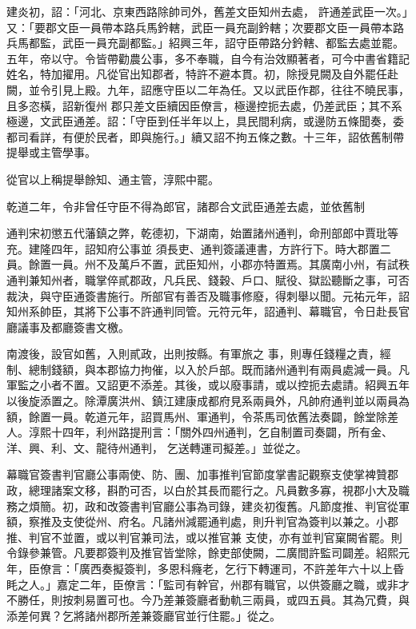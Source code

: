 \begin{pinyinscope}
 建炎初，詔：「河北、京東西路除帥司外，舊差文臣知州去處，
 許通差武臣一次。」又：「要郡文臣一員帶本路兵馬鈐轄，武臣一員充副鈐轄；次要郡文臣一員帶本路兵馬都監，武臣一員充副都監。」紹興三年，詔守臣帶路分鈐轄、都監去處並罷。五年，帝以守。令皆帶勸農公事，多不奉職，自今有治效顯著者，可今中書省籍記姓名，特加擢用。凡從官出知郡者，特許不避本貫。初，除授見闕及自外罷任赴闕，並令引見上殿。九年，詔應守臣以二年為任。又以武臣作郡，往往不曉民事，且多恣橫，詔新復州
 郡只差文臣續因臣僚言，極邊控扼去處，仍差武臣；其不系極邊，文武臣通差。詔：「守臣到任半年以上，具民間利病，或邊防五條聞奏，委都司看詳，有便於民者，即與施行。」續又詔不拘五條之數。十三年，詔依舊制帶提舉或主管學事。



 從官以上稱提舉餘知、通主管，淳熙中罷。



 乾道二年，令非曾任守臣不得為郎官，諸郡合文武臣通差去處，並依舊制



 通判宋初懲五代藩鎮之弊，乾德初，下湖南，始置諸州通判，命刑部郎中賈玭等充。建隆四年，詔知府公事並
 須長吏、通判簽議連書，方許行下。時大郡置二員。餘置一員。州不及萬戶不置，武臣知州，小郡亦特置焉。其廣南小州，有試秩通判兼知州者，職掌倅貳郡政，凡兵民、錢穀、戶口、賦役、獄訟聽斷之事，可否裁決，與守臣通簽書施行。所部官有善否及職事修廢，得刺舉以聞。元祐元年，詔知州系帥臣，其將下公事不許通判同管。元符元年，詔通判、幕職官，令日赴長官廳議事及都廳簽書文檄。



 南渡後，設官如舊，入則貳政，出則按縣。有軍旅之
 事，則專任錢糧之責，經制、總制錢額，與本郡協力拘催，以入於戶部。既而諸州通判有兩員處減一員。凡軍監之小者不置。又詔更不添差。其後，或以廢事請，或以控扼去處請。紹興五年以後旋添置之。除潭廣洪州、鎮江建康成都府見系兩員外，凡帥府通判並以兩員為額，餘置一員。乾道元年，詔買馬州、軍通判，令茶馬司依舊法奏闢，餘堂除差人。淳熙十四年，利州路提刑言：「關外四州通判，乞自制置司奏闢，所有金、洋、興、利、文、龍待州通判，
 乞送轉運司擬差。」並從之。



 幕職官簽書判官廳公事兩使、防、團、加事推判官節度掌書記觀察支使掌裨贊郡政，總理諸案文移，斟酌可否，以白於其長而罷行之。凡員數多寡，視郡小大及職務之煩簡。初，政和改簽書判官廳公事為司錄，建炎初復舊。凡節度推、判官從軍額，察推及支使從州、府名。凡諸州減罷通判處，則升判官為簽判以兼之。小郡推、判官不並置，或以判官兼司法，或以推官兼
 支使，亦有並判官窠闕省罷。則令錄參兼管。凡要郡簽判及推官皆堂除，餘吏部使闕，二廣間許監司闢差。紹熙元年，臣僚言：「廣西奏擬簽判，多恩科癃老，乞行下轉運司，不許差年六十以上昏眊之人。」嘉定二年，臣僚言：「監司有幹官，州郡有職官，以供簽廳之職，或非才不勝任，則按刺易置可也。今乃差兼簽廳者動軌三兩員，或四五員。其為冗費，與添差何異？乞將諸州郡所差兼簽廳官並行住罷。」從之。




\end{pinyinscope}
